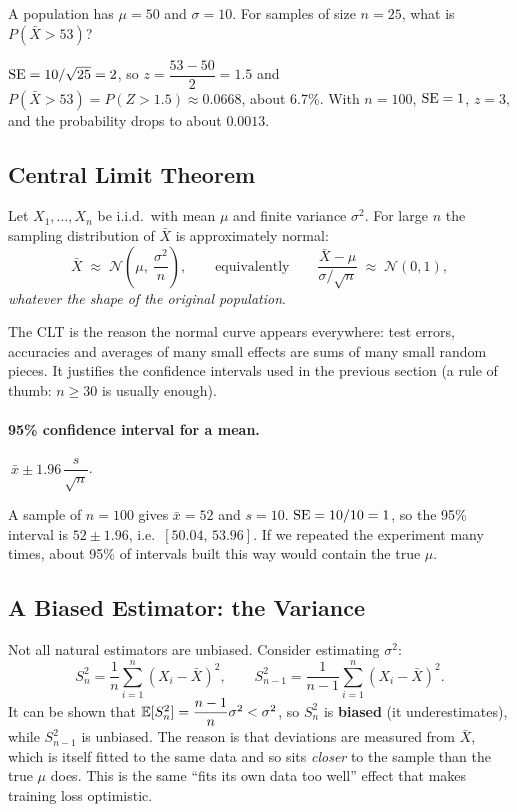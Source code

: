 \begin{example}
A population has $\mu=50$ and $\sigma=10$. For samples of size $n=25$, what is $P(\bar X>53)$?\par
$\operatorname{SE}=10/\sqrt{25}=2$, so $z=\dfrac{53-50}{2}=1.5$ and $P(\bar X>53)=P(Z>1.5)\approx 0.0668$, about 6.7\%. With $n=100$, $\operatorname{SE}=1$, $z=3$, and the probability drops to about $0.0013$.
\end{example}

\subsection{Central Limit Theorem}

\begin{definition}
Let $X_1,\dots,X_n$ be i.i.d.\ with mean $\mu$ and finite variance $\sigma^2$. For large $n$ the sampling distribution of $\bar X$ is approximately normal:
\[
  \bar X \;\approx\; \mathcal N\!\left(\mu,\ \frac{\sigma^2}{n}\right),\qquad\text{equivalently}\qquad
  \frac{\bar X-\mu}{\sigma/\sqrt n}\;\approx\; \mathcal N(0,1),
\]
\emph{whatever the shape of the original population}.
\end{definition}

The CLT is the reason the normal curve appears everywhere: test errors, accuracies and averages of many small effects are sums of many small random pieces. It justifies the confidence intervals used in the previous section (a rule of thumb: $n\ge 30$ is usually enough).

\paragraph{95\% confidence interval for a mean.} $\ \bar x \pm 1.96\,\dfrac{s}{\sqrt n}$.

\begin{example}
A sample of $n=100$ gives $\bar x=52$ and $s=10$. $\operatorname{SE}=10/10=1$, so the 95\% interval is $52\pm1.96$, i.e.\ $[50.04,\,53.96]$. If we repeated the experiment many times, about 95\% of intervals built this way would contain the true $\mu$.
\end{example}

\subsection{A Biased Estimator: the Variance}

Not all natural estimators are unbiased. Consider estimating $\sigma^2$:
\[
  S_n^2=\frac1n\sum_{i=1}^n(X_i-\bar X)^2,\qquad
  S_{n-1}^2=\frac1{n-1}\sum_{i=1}^n(X_i-\bar X)^2 .
\]
It can be shown that $\mathbb{E}[S_n^2]=\dfrac{n-1}{n}\sigma^2<\sigma^2$, so $S_n^2$ is \textbf{biased} (it underestimates), while $S_{n-1}^2$ is unbiased. The reason is that deviations are measured from $\bar X$, which is itself fitted to the same data and so sits \emph{closer} to the sample than the true $\mu$ does. This is the same ``fits its own data too well'' effect that makes training loss optimistic.

